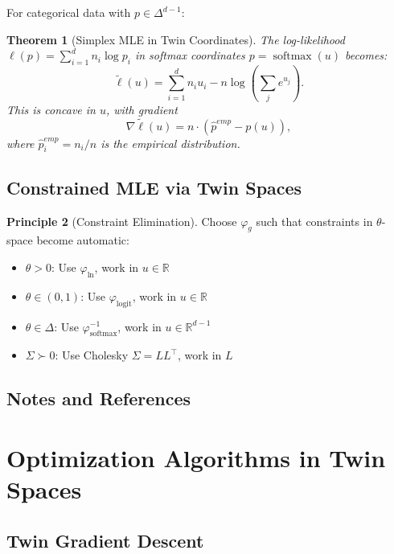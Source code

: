 \documentclass[11pt,twoside]{book}
\theoremstyle{plain}
\newtheorem{theorem}{Theorem}[chapter]
\theoremstyle{definition}
\newtheorem{principle}[theorem]{Principle}
\theoremstyle{remark}
\newcommand{\R}{\mathbb{R}}
\DeclareMathOperator{\softmax}{softmax}
\DeclareMathOperator{\logit}{logit}
\newcommand{\simplex}{\Delta}
\begin{document}
For categorical data with $p \in \simplex^{d-1}$:

\begin{theorem}[Simplex MLE in Twin Coordinates]
    The log-likelihood $\ell(p) = \sum_{i=1}^d n_i \log p_i$ in softmax coordinates $p = \softmax(u)$ becomes:
    \[
    \tilde{\ell}(u) = \sum_{i=1}^d n_i u_i - n \log\left(\sum_j e^{u_j}\right).
    \]
    This is concave in $u$, with gradient
    \[
    \nabla \tilde{\ell}(u) = n \cdot (\hat{p}^{emp} - p(u)),
    \]
    where $\hat{p}^{emp}_i = n_i/n$ is the empirical distribution.
\end{theorem}

\section{Constrained MLE via Twin Spaces}
\label{sec:constrained_mle}

\begin{principle}[Constraint Elimination]
    Choose $\varphi_g$ such that constraints in $\theta$-space become automatic:
    \begin{itemize}
        \item $\theta > 0$: Use $\varphi_{\ln}$, work in $u \in \R$
        \item $\theta \in (0,1)$: Use $\varphi_{\logit}$, work in $u \in \R$
        \item $\theta \in \simplex$: Use $\varphi_{\softmax}^{-1}$, work in $u \in \R^{d-1}$
        \item $\Sigma \succ 0$: Use Cholesky $\Sigma = LL^\top$, work in $L$
    \end{itemize}
\end{principle}

\section{Notes and References}
\label{sec:ch4_notes}


\chapter{Optimization Algorithms in Twin Spaces}
\label{ch:optimization}

\section{Twin Gradient Descent}
\label{sec:twin_gd}
\end{document}
